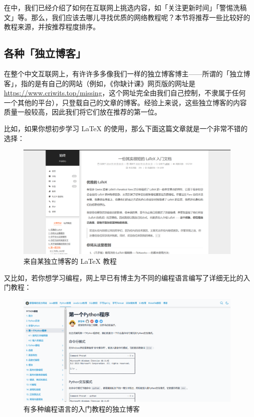 在中，我们已经介绍了如何在互联网上挑选内容，如「关注更新时间」「警惕洗稿文」等。那么，我们应该去哪儿寻找优质的网络教程呢？本节将推荐一些比较好的教程来源，并按推荐程度排序。

\subsection{各种「独立博客」}

在整个中文互联网上，有许许多多像我们一样的独立博客博主——所谓的「独立博客」，指的是有自己的网站（例如，《你缺计课》网页版的网址是 \url{https://www.criwits.top/missing}，这个网址完全由我们自己控制，不隶属于任何一个其他的平台），只登载自己的文章的博客。经验上来说，这些独立博客的内容质量一般较高，因此我们将它们放在推荐的第一位。

比如，如果你想初步学习 \LaTeX{} 的使用，那么下面这篇文章就是一个非常不错的选择：

\begin{figure}[htb!]
  \centering
  \includegraphics[width=.7\textwidth]{assets/software/LaTeX_tutorial.png}
  \caption{来自某独立博客的 \LaTeX{} 教程}
  \label{fig:LaTeX_tutorial}
\end{figure}

又比如，若你想学习编程，网上早已有博主为不同的编程语言编写了详细无比的入门教程：

\begin{figure}[htb!]
  \centering
  \includegraphics[width=.7\textwidth]{assets/software/LXF_mainpage.png}
  \caption{有多种编程语言的入门教程的独立博客}
  \label{fig:LXF_mainpage}
\end{figure}

